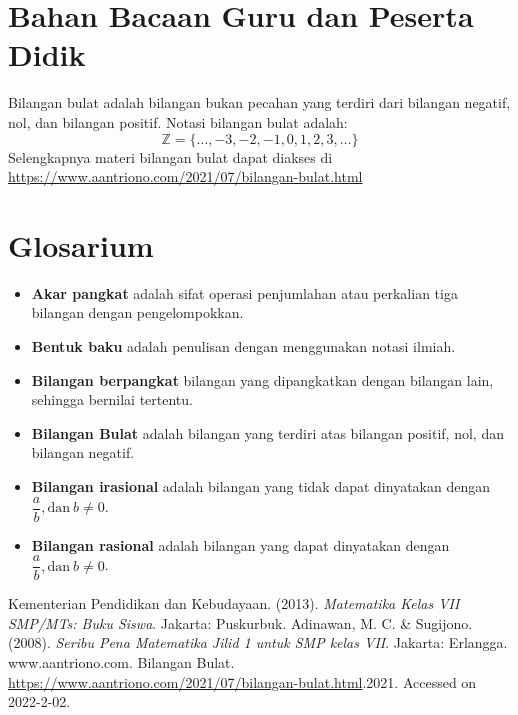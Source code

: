\documentclass[a5paper,10pt,openany]{book}
\begin{document}
\section{Bahan Bacaan Guru dan Peserta Didik}

{\color{blue}
Bilangan bulat adalah bilangan bukan pecahan yang terdiri dari bilangan negatif, nol, dan bilangan positif. Notasi bilangan bulat adalah:\[\mathbb{Z}=\{\ldots,-3, -2, -1, 0, 1, 2, 3, \ldots \}\]
Selengkapnya materi bilangan bulat dapat diakses di \url{https://www.aantriono.com/2021/07/bilangan-bulat.html}
}

\section{Glosarium}

{\color{NavyBlue}\begin{itemize}[\faSearch,leftmargin=*,itemsep=-4pt,topsep=2pt]	
		\item \textbf{Akar pangkat} adalah sifat operasi penjumlahan atau perkalian tiga bilangan dengan pengelompokkan.
		\item \textbf{Bentuk baku} adalah penulisan dengan menggunakan notasi ilmiah.
		\item \textbf{Bilangan berpangkat} bilangan yang dipangkatkan dengan bilangan lain, sehingga bernilai tertentu.	
		\item \textbf{Bilangan Bulat} adalah bilangan yang terdiri atas bilangan positif, nol, dan bilangan negatif.
		\item \textbf{Bilangan irasional} adalah bilangan yang tidak dapat dinyatakan dengan $\dfrac{a}{b}, \text{dan}\ b\neq 0$.
		\item \textbf{Bilangan rasional} adalah bilangan yang dapat dinyatakan dengan $\dfrac{a}{b}, \text{dan}\ b\neq 0$.
\end{itemize}
}







\begin{thebibliography}{99}
{\color{NavyBlue}
Kementerian Pendidikan dan Kebudayaan. (2013). \emph {Matematika Kelas VII SMP/MTs: Buku Siswa}. Jakarta: Puskurbuk.
Adinawan, M. C. \& Sugijono. (2008). \emph {Seribu Pena Matematika Jilid 1 untuk SMP kelas VII}. Jakarta: Erlangga.
 www.aantriono.com. Bilangan Bulat.
\url{https://www.aantriono.com/2021/07/bilangan-bulat.html}.2021. Accessed on 2022-2-02.
}
\end{thebibliography}
\end{document}
